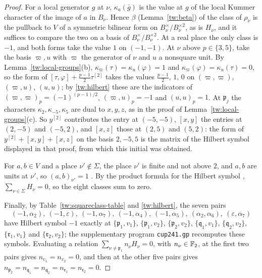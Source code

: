 \begin{proof}
For a local generator $g$ at $\nu$, $\kappa_a(\bar g)$ is the value at $g$ of
the local Kummer character of the image of $a$ in $B_\nu$. Hence
$\beta$ (Lemma~\ref{tw:beta}) of the class of $\rho_\nu$ is the pullback to $V$ of a symmetric
bilinear form on $B_\nu^\times/B_\nu^{\times2}$, as is $H_\nu$, and it
suffices to compare the two on a basis of $B_\nu^\times/B_\nu^{\times2}$. At a
real place the only class is $-1$, and both forms take the value $1$ on
$(-1,-1)$. At $\nu$ above $p\in\{3,5\}$, take the basis $\varpi,u$ with
$\varpi$ the generator of $\nu$ and $u$ a nonsquare unit. By
Lemma~\ref{tw:local-groups}(b), $\kappa_\varpi(\tau)=\kappa_u(\varphi)=1$ and
$\kappa_\varpi(\varphi)=\kappa_u(\tau)=0$, so the form of
$[\tau,\varphi]+\frac{p-1}2\tau^{[2]}$ takes the values $\frac{p-1}2$, $1$,
$0$ on $(\varpi,\varpi)$, $(\varpi,u)$, $(u,u)$; by \eqref{tw:hilbert} these
are the indicators of $(\varpi,\varpi)_p=(-1)^{(p-1)/2}$, $(\varpi,u)_p=-1$
and $(u,u)_p=1$. At $\mathfrak p_j$ the characters $\kappa_2,\kappa_{-5},\kappa_5$
are dual to $x,y,z$, as in the proof of Lemma~\ref{tw:local-groups}(c). So
$y^{[2]}$ contributes the entry at $(-5,-5)$, $[x,y]$ the entries at $(2,-5)$
and $(-5,2)$, and $[x,z]$ those at $(2,5)$ and $(5,2)$: the form of
$y^{[2]}+[x,y]+[x,z]$ on the basis $2,-5,5$ is the matrix of the Hilbert
symbol displayed in that proof, from which this initial was obtained.

For $a,b\in V$ and a place $\nu'\notin\Sigma$, the place $\nu'$ is finite
and not above $2$, and $a,b$ are units at $\nu'$, so $(a,b)_{\nu'}=1$
\cite[Chapter~VIII, 5.8]{MilneCFT}. By the
product formula for the Hilbert symbol \cite[Chapter~V, Example~5.4]{MilneCFT},
$\sum_{\nu\in\Sigma}H_\nu=0$, so the eight classes sum to zero.

Finally, by Table~\ref{tw:squareclass-table} and \eqref{tw:hilbert}, the
seven pairs
\[
 (-1,\alpha_2),\ (-1,\varepsilon),\ (-1,\alpha_7),\ (-1,\alpha_4),\
 (-1,\alpha_5),\ (\alpha_2,\alpha_6),\ (\varepsilon,\alpha_7)
\]
have Hilbert symbol $-1$ exactly at $\{\mathfrak p_1,v_1\}$,
$\{\mathfrak p_1,v_2\}$, $\{\mathfrak p_2,v_2\}$, $\{\mathfrak q_1,v_1\}$,
$\{\mathfrak q_2,v_2\}$, $\{\mathfrak r_1,v_1\}$ and $\{\mathfrak r_2,v_2\}$;
the supplementary program \texttt{cup241.gp} recomputes these symbols.
Evaluating a relation $\sum_{\nu\ne\mathfrak p_1}n_\nu H_\nu=0$, with
$n_\nu\in\mathbb F_2$, at the first two pairs gives $n_{v_1}=n_{v_2}=0$, and then
at the other five pairs gives
$n_{\mathfrak p_2}=n_{\mathfrak q_1}=n_{\mathfrak q_2}=n_{\mathfrak r_1}=n_{\mathfrak r_2}=0$.
\end{proof}

